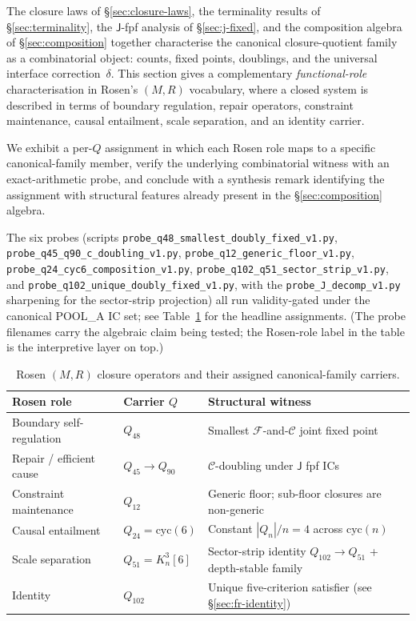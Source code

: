 \documentclass[12pt,a4paper]{article}
\theoremstyle{definition}
\theoremstyle{remark}
\newcommand{\Kn}{K_n^3}
\newcommand{\Qn}{Q_n}
\newcommand{\Ccls}{\mathcal{C}}             %
\newcommand{\Fcls}{\mathcal{F}}             %
\newcommand{\Jconj}{\mathsf{J}}             %
\newcommand{\cyc}{\mathrm{cyc}}
\begin{document}
The closure laws of \S\ref{sec:closure-laws}, the terminality results
of \S\ref{sec:terminality}, the $\Jconj$-fpf analysis of
\S\ref{sec:j-fixed}, and the composition algebra of
\S\ref{sec:composition} together characterise the canonical
closure-quotient family as a combinatorial object: counts, fixed
points, doublings, and the universal interface correction~$\delta$.
This section gives a complementary \emph{functional-role}
characterisation in Rosen's $(M,R)$ vocabulary, where a closed system
is described in terms of boundary regulation, repair operators,
constraint maintenance, causal entailment, scale separation, and an
identity carrier.

We exhibit a per-$Q$ assignment in which each Rosen role maps to a
specific canonical-family member, verify the underlying combinatorial
witness with an exact-arithmetic probe, and conclude with a synthesis
remark identifying the assignment with structural features already
present in the \S\ref{sec:composition} algebra.

The six probes (scripts
\texttt{probe\_q48\_smallest\_doubly\_fixed\_v1.py},
\texttt{probe\_q45\_q90\_c\_doubling\_v1.py},
\texttt{probe\_q12\_generic\_floor\_v1.py},
\texttt{probe\_q24\_cyc6\_composition\_v1.py},
\texttt{probe\_q102\_q51\_sector\_strip\_v1.py}, and
\texttt{probe\_q102\_unique\_doubly\_fixed\_v1.py}, with the
\texttt{probe\_J\_decomp\_v1.py} sharpening for the sector-strip
projection) all run validity-gated under the canonical POOL\_A IC
set; see Table~\ref{tab:functional-roles} for the headline
assignments. (The probe filenames carry the algebraic claim being
tested; the Rosen-role label in the table is the interpretive layer
on top.)

\begin{table}[H]\small
\centering
\caption{Rosen $(M,R)$ closure operators and their assigned
canonical-family carriers.}\label{tab:functional-roles}
\begin{tabular}{@{}llp{}@{}}
\toprule
Rosen role & Carrier $Q$ & Structural witness \\
\midrule
Boundary self-regulation         & $Q_{48}$               & Smallest $\Fcls$-and-$\Ccls$ joint fixed point \\
Repair / efficient cause         & $Q_{45} \to Q_{90}$    & $\Ccls$-doubling under $\Jconj$ fpf ICs \\
Constraint maintenance           & $Q_{12}$               & Generic floor; sub-floor closures are non-generic \\
Causal entailment                & $Q_{24} = \cyc(6)$     & Constant $|\Qn|/n = 4$ across $\cyc(n)$ \\
Scale separation                 & $Q_{51} = \Kn[6]$      & Sector-strip identity $Q_{102} \to Q_{51}$ + depth-stable family \\
Identity                         & $Q_{102}$              & Unique five-criterion satisfier (see \S\ref{sec:fr-identity}) \\
\bottomrule
\end{tabular}
\end{table}
\end{document}

